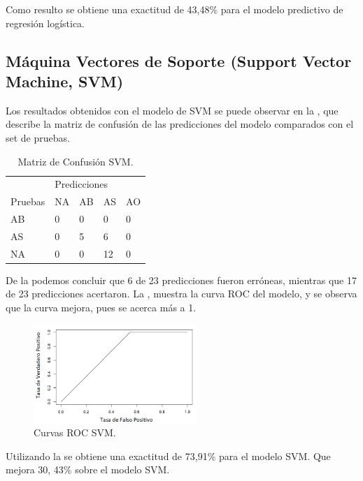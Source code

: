\documentclass{textolivre}
\begin{document}
Como resulto se obtiene una exactitud de 43,48\% para el modelo predictivo de regresión logística.

\subsection{Máquina Vectores de Soporte (Support Vector Machine, SVM)}
Los resultados obtenidos con el modelo de SVM  se puede observar en la , que describe la matriz de confusión de las predicciones del modelo comparados con el set de pruebas.

\begin{table}[htpb]
\centering
\caption{Matriz de Confusión SVM.}
\label{tab4}
\begin{tabular}{lllll}
\toprule 
 & \multicolumn{4}{l}{Predicciones}   \\ 
\cmidrule{2-5}
Pruebas        & NA      & AB       & AS       & AO
\\ 
\midrule
AB             & 0       & 0        & 0        & 0
\\ 
AS             & 0       & 5        & 6        & 0
\\
NA             & 0       & 0        & 12       & 0
\\
\bottomrule
\end{tabular}
\end{table}

De la  podemos concluir que 6 de 23 predicciones fueron erróneas, mientras que 17 de 23 predicciones acertaron. La , muestra la curva ROC del modelo, y se observa que la curva mejora, pues se acerca más a 1.

\begin{figure}[htbp]
 \centering
 \includegraphics[width=0.55\textwidth]{figura9.png}
 \caption{Curvas ROC SVM.}
 \label{figura9}
\end{figure}

Utilizando la  se obtiene una exactitud de 73,91\% para el modelo SVM. Que mejora 30, 43\% sobre el modelo SVM.
\end{document}
